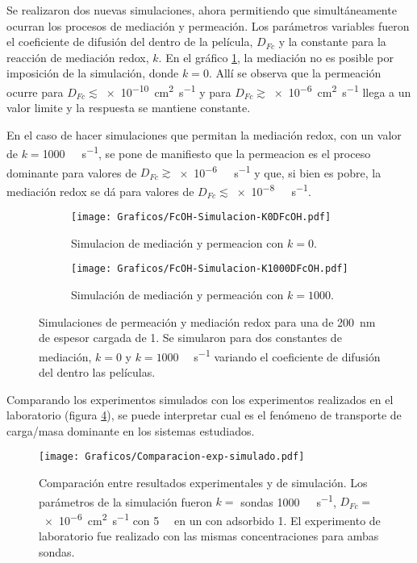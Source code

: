 		Se realizaron dos nuevas simulaciones, ahora permitiendo que simultáneamente ocurran los procesos de mediación y permeación. Los parámetros variables fueron el coeficiente de difusión del \fc\space dentro de la película, $D_{Fc}$ y la constante para la reacción de mediación redox, $k$. En el gráfico \ref{fig:sim_med_k0}, la mediación no es posible por imposición de la simulación, donde $k=0$. Allí se observa que la permeación ocurre para $D_{Fc}\lesssim$\SI{e-10}{\square\cm\per\second} y para $D_{Fc}\gtrsim$\SI{e-6}{\square\cm\per\second} llega a un valor limite y la respuesta se mantiene constante.

		En el caso de hacer simulaciones que permitan la mediación redox, con un valor de $k=$\SI{1000}{\per\Molar\per\second}, se pone de manifiesto que la permeacion es el proceso dominante para valores de $D_{Fc}\gtrsim$\SI{e-6}{\per\Molar\per\second} y que, si bien es pobre, la mediación redox se dá para valores de $D_{Fc}\lesssim$\SI{e-8}{\per\Molar\per\second}.

			\begin{figure}[ht]
				\begin{subfigure}[t]{0.495\textwidth}
					\centering
			 	    \texttt{[image: Graficos/FcOH-Simulacion-K0DFcOH.pdf]}
			        \caption{Simulacion de mediación y permeacion con $k=0$.}
			        \label{fig:sim_med_k0}
			      	\end{subfigure}
				\begin{subfigure}[t]{0.495\textwidth}
					\centering
			 	    \texttt{[image: Graficos/FcOH-Simulacion-K1000DFcOH.pdf]}
			        \caption{Simulación de mediación y permeación con $k=1000$.}
			        \label{fig:sim_med_1000}
			      	\end{subfigure}
			      	\caption[Simulación EQ de mediación/permeación]{Simulaciones de permeación y mediación redox para una \pdm\space de \SI{200}{nm} de espesor cargada de \ru\space \SI{1}{\Molar}. Se simularon para dos constantes de mediación, $k=0$ y $k=1000$ \si{\per\Molar\per\second} variando el coeficiente de difusión del \fc\space dentro las películas.}
			      	\label{fig:sim_med_perm}
			      	\end{figure}
			      	
		Comparando los experimentos simulados con los experimentos realizados en el laboratorio (figura \ref{fig:comp_sim_exp}), se puede interpretar cual es el fenómeno de transporte de carga/masa dominante en los sistemas estudiados. 

				\begin{figure}[ht]
					\centering
			 	    \texttt{[image: Graficos/Comparacion-exp-simulado.pdf]}
			        \caption[Simulación EQ comparadas con datos experimentales]{Comparación entre resultados experimentales y de simulación. Los parámetros de la simulación fueron $k=$ sondas \SI{1000}{\per\Molar\per\second}, $D_{Fc}=$ \SI{e-6}{\square\cm\per\second} con \fc\space \SI{5}{\milli\Molar} en un \pdm\space con \ru\space adsorbido \SI{1}{\Molar}. El experimento de laboratorio fue realizado con las mismas concentraciones para ambas sondas.}
			        \label{fig:comp_sim_exp}
			      	\end{figure}
		
